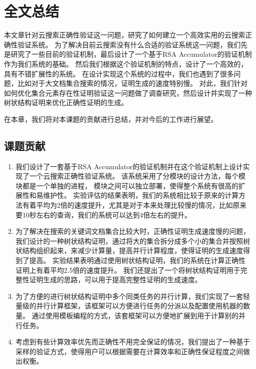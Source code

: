 \chapter{全文总结}
\label{chap:conclusion}

本文章针对云搜索正确性验证这一问题，研究了如何建立一个高效实用的云搜索正确性验证系统。
为了解决目前云搜索没有什么合适的验证系统这一问题，我们先是研究了一些目前的验证机制，最后设计了一个基于RSA Accumulator的验证机制作为我们系统的基础。
然后我们根据这个验证机制的特点，设计了一个高效的，具有不错扩展性的系统。
在设计实现这个系统的过程中，我们也遇到了很多问题，比如对于大文档集合搜索的情况，证明生成的速度特别慢。
对此，我们针对如何优化集合元素存在性证明验证这一问题做了调查研究，然后设计并实现了一种树状结构证明来优化正确性证明的生成。

在本章，我们将对本课题的贡献进行总结，并对今后的工作进行展望。

\section{课题贡献}
\begin{enumerate}
\item 
我们设计了一套基于RSA Accumulator的验证机制并在这个验证机制上设计实现了一个云搜索正确性验证系统。
该系统采用了分模块的设计方法，每个模块都是一个单独的进程，
模块之间可以独立部署，使得整个系统有很高的扩展性和易维护性。
实验评估的结果表明，我们的系统相比较于原来的计算方法有着平均为2倍的速度提升，尤其是对于本来处理比较慢的情况，比如原来要10秒左右的查询，我们的系统可以达到4倍左右的提升。
\item
为了解决在搜索的关键词文档集合比较大时，正确性证明生成速度慢的问题，
我们设计的一种树状结构证明，通过将大的集合拆分成多个小的集合并按照树状结构组织起来，来减少计算量，提高并行计算程度，使得证明的生成速度得到了提高。
实验结果表明通过使用树状结构证明，我们的系统在计算正确性证明上有着平均2.5倍的速度提升。
我们还提出了一个将树状结构证明用于完整性证明生成的思路，可以用于提高完整性证明的生成速度。
\item 
为了方便的进行树状结构证明中多个同类任务的并行计算，我们实现了一套轻量级的并行计算框架，该框架可以方便进行任务的分派以及配置使用机器的数量。
通过使用模板编程的方式，该套框架可以方便地扩展到用于计算别的并行任务。
\item
考虑到有些计算效率优先而正确性不用完全保证的情况，我们提出了一种基于采样的验证方式，使得用户可以根据需要在计算效率和正确性保证程度之间做出权衡。

\end{enumerate}

